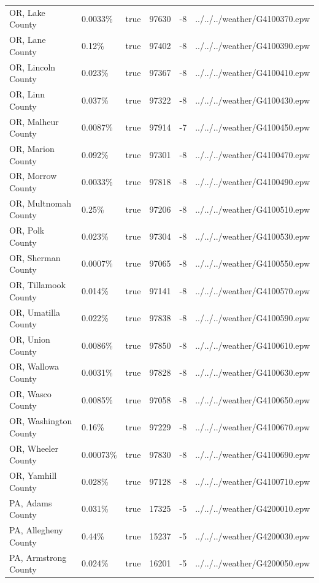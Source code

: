 \begin{longtable}[]{@{}llllll@{}}
OR, Lake County & 0.0033\% & true & 97630 & -8 &
../../../weather/G4100370.epw \\
OR, Lane County & 0.12\% & true & 97402 & -8 &
../../../weather/G4100390.epw \\
OR, Lincoln County & 0.023\% & true & 97367 & -8 &
../../../weather/G4100410.epw \\
OR, Linn County & 0.037\% & true & 97322 & -8 &
../../../weather/G4100430.epw \\
OR, Malheur County & 0.0087\% & true & 97914 & -7 &
../../../weather/G4100450.epw \\
OR, Marion County & 0.092\% & true & 97301 & -8 &
../../../weather/G4100470.epw \\
OR, Morrow County & 0.0033\% & true & 97818 & -8 &
../../../weather/G4100490.epw \\
OR, Multnomah County & 0.25\% & true & 97206 & -8 &
../../../weather/G4100510.epw \\
OR, Polk County & 0.023\% & true & 97304 & -8 &
../../../weather/G4100530.epw \\
OR, Sherman County & 0.0007\% & true & 97065 & -8 &
../../../weather/G4100550.epw \\
OR, Tillamook County & 0.014\% & true & 97141 & -8 &
../../../weather/G4100570.epw \\
OR, Umatilla County & 0.022\% & true & 97838 & -8 &
../../../weather/G4100590.epw \\
OR, Union County & 0.0086\% & true & 97850 & -8 &
../../../weather/G4100610.epw \\
OR, Wallowa County & 0.0031\% & true & 97828 & -8 &
../../../weather/G4100630.epw \\
OR, Wasco County & 0.0085\% & true & 97058 & -8 &
../../../weather/G4100650.epw \\
OR, Washington County & 0.16\% & true & 97229 & -8 &
../../../weather/G4100670.epw \\
OR, Wheeler County & 0.00073\% & true & 97830 & -8 &
../../../weather/G4100690.epw \\
OR, Yamhill County & 0.028\% & true & 97128 & -8 &
../../../weather/G4100710.epw \\
PA, Adams County & 0.031\% & true & 17325 & -5 &
../../../weather/G4200010.epw \\
PA, Allegheny County & 0.44\% & true & 15237 & -5 &
../../../weather/G4200030.epw \\
PA, Armstrong County & 0.024\% & true & 16201 & -5 &
../../../weather/G4200050.epw \\

\end{longtable}
